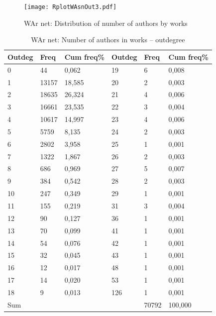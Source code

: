 \documentclass[11pt]{article} %
\begin{document}
\begin{figure}
\centerline{\texttt{[image: RplotWAsnOut3.pdf]}}
\caption{WAr net: Distribution of number of authors by works}\label{authworks}
\end{figure}
\medskip   

\begin{table}
\caption{WAr net: \label{numpapout} Number of authors in works -- outdegree} 
\renewcommand{\arraystretch}{0.9}
\begin{center}
\begin{tabular}{l|l|l||l|l|l}
Outdeg&  	Freq&  	Cum freq\% &  	Outdeg&   Freq &	Cum freq\%\\ \hline   
0	&44	&0,062	&19	&6 	&0,008	     \\
1	&13157	&18,585	&20	&2	&0,003	     \\
2	&18635	&26,324	&21	&4	&0,006	     \\
3	&16661	&23,535	&22	&3	&0,004	     \\
4	&10617	&14,997	&23	&4	&0,006	     \\
5	&5759	&8,135	&24	&2	&0,003	     \\
6	&2802	&3,958	&25	&1	&0,001	     \\
7	&1322	&1,867	&26	&2	&0,003	     \\
8	&686	&0,969	&27	&5	&0,007	     \\
9	&384	&0,542	&28	&2	&0,003	     \\
10	&247	&0,349	&29	&1	&0,001	     \\
11	&155	&0,219	&31	&3	&0,004	     \\
12	&90	&0,127	&36	&1	&0,001	     \\
13	&70	&0,099	&41	&1	&0,001	     \\
14	&54	&0,076	&42	&1	&0,001	     \\
15	&32	&0,045	&43	&1	&0,001	     \\
16	&12	&0,017	&48	&1	&0,001	     \\
17	&14	&0,020	&53	&1	&0,001	     \\
18	&9	&0,013	&126	&1	&0,001	     \\		\hline 
Sum	& & & & 70792	& 100,000		\\ \hline	
\end{tabular}
\end{center}
\end{table}
\end{document}
